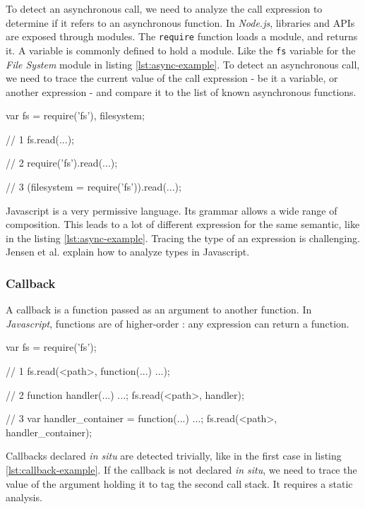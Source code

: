 To detect an asynchronous call, we need to analyze the call expression to determine if it refers to an asynchronous function.
In \textit{Node.js}, libraries and APIs are exposed through modules.
The \texttt{require} function loads a module, and returns it.
A variable is commonly defined to hold a module.
Like the \texttt{fs} variable for the \textit{File System} module in listing \ref{lst:async-example}.
To detect an asynchronous call, we need to trace the current value of the call expression - be it a variable, or another expression - and compare it to the list of known asynchronous functions.

\begin{code}[js, %
             caption={Three equivalent way of calling the \texttt{read} asynchronous function from the \textit{File System} module}, %
             label={lst:async-example}] %
var fs = require('fs'),
    filesystem;

// 1
fs.read(...);

// 2
require('fs').read(...);

// 3
(filesystem = require('fs')).read(...);
\end{code}

Javascript is a very permissive language.
Its grammar allows a wide range of composition.
This leads to a lot of different expression for the same semantic, like in the listing \ref{lst:async-example}.
Tracing the type of an expression is challenging.
Jensen et al. explain how to analyze types in Javascript\cite{Jensen2009}.

\subsubsection{Callback}

A callback is a function passed as an argument to another function.
In \textit{Javascript}, functions are of higher-order : any expression can return a function.

\begin{code}[js, %
             caption={Three equivalent expression returning a function to be used as a callback}, %
             label={lst:callback-example}] %
var fs = require('fs');

// 1
fs.read(<path>, function(...) {...});

// 2
function handler(...) {...};
fs.read(<path>, handler);

// 3
var handler_container = function(...) {...};
fs.read(<path>, handler_container);
\end{code}

Callbacks declared \textit{in situ} are detected trivially, like in the first case in listing \ref{lst:callback-example}.
If the callback is not declared \textit{in situ}, we need to trace the value of the argument holding it to tag the second call stack.
It requires a static analysis\cite{Cytron1991,Andersen1994,Abramsky1987,Cousot1977,Agesen1995,Ferrante1987,Horwitz1990,Logozzo2010,Rosen1988,Cousot1979,Gardner2012,Aiken1993,Aiken1991,Jensen2011,Jensen2012,Kam1977,Maffeis2008,Agesen1994,Richards2011,Anderson2005,Cytron1989,Jones2003,Thiemann2005,Tip1995,Sridharan2009,Agrawal1990,Alpern1988,Furr2009,Hackett2012,Jensen2009,Richards2010,Jang2009}.